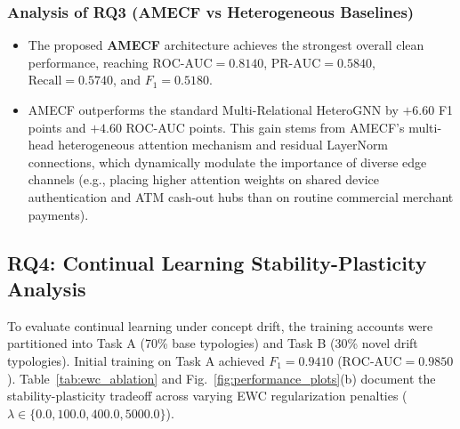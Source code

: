 \subsubsection{Analysis of RQ3 (AMECF vs Heterogeneous Baselines)}
\begin{itemize}
    \item The proposed \textbf{AMECF} architecture achieves the strongest overall clean performance, reaching $\text{ROC-AUC} = \mathbf{0.8140}$, $\text{PR-AUC} = \mathbf{0.5840}$, $\text{Recall} = \mathbf{0.5740}$, and $F_1 = \mathbf{0.5180}$.
    \item AMECF outperforms the standard Multi-Relational HeteroGNN by $+6.60$ F1 points and $+4.60$ ROC-AUC points. This gain stems from AMECF's multi-head heterogeneous attention mechanism and residual LayerNorm connections, which dynamically modulate the importance of diverse edge channels (e.g., placing higher attention weights on shared device authentication and ATM cash-out hubs than on routine commercial merchant payments).
\end{itemize}

\subsection{RQ4: Continual Learning Stability-Plasticity Analysis}
To evaluate continual learning under concept drift, the training accounts were partitioned into Task A (70\% base typologies) and Task B (30\% novel drift typologies). Initial training on Task A achieved $F_1 = 0.9410$ ($\text{ROC-AUC} = 0.9850$). Table~\ref{tab:ewc_ablation} and Fig.~\ref{fig:performance_plots}(b) document the stability-plasticity tradeoff across varying EWC regularization penalties ($\lambda \in \{0.0, 100.0, 400.0, 5000.0\}$).

\begin{table}[t]
\centering
\caption{EWC Continual Learning Stability-Plasticity Ablation Sweep}
\label{tab:ewc_ablation}
\end{table}

